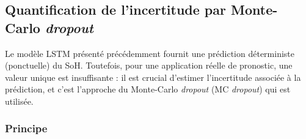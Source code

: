 %
%

\subsection{Quantification de l'incertitude par Monte-Carlo \textit{dropout}}
\label{subsec:mcdropout}

Le modèle LSTM présenté précédemment fournit une prédiction déterministe (ponctuelle) du SoH. Toutefois, pour une application réelle de pronostic, une valeur unique est insuffisante : il est crucial d'estimer l'incertitude associée à la prédiction, et c'est l'approche du Monte-Carlo \textit{dropout} (MC \textit{dropout}) qui est utilisée.

\subsubsection{Principe}

